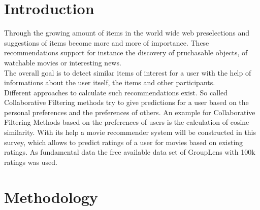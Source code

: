\documentclass[a4paper,12pt,twoside]{article}
\begin{document}
\section{Introduction}
Through the growing amount of items in the world wide web preselections and suggestions of items become more and more of importance. These recommendations
 support for instance the discovery of pruchasable objects, of watchable movies or
 interesting news.\\
The overall goal is to detect similar items of interest for a user with the help of informations about the user itself, the items and other participants. 
\cite{WebScience}\\
Different approaches to calculate such recommendations exist. So called Collaborative Filtering methods try to give predictions for a user based on the personal preferences and the preferences of others.  
An example for Collaborative Filtering Methods based on the preferences of users is the calculation of cosine similarity. With its help a movie recommender system will be constructed in this survey, which allows to predict ratings of a user for movies based on existing ratings. As fundamental data the free available data set of GroupLens with 100k ratings was used. \cite{grouplens}
 

\section{Methodology}
\end{document}
